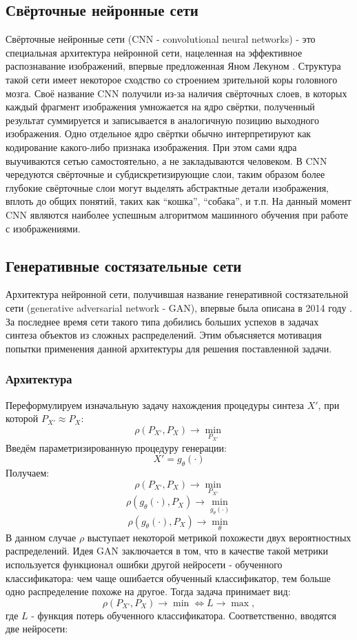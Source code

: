 	\subsection{Свёрточные нейронные сети}
		Свёрточные нейронные сети (CNN - convolutional neural networks) - это специальная архитектура нейронной сети, нацеленная на эффективное распознавание изображений, впервые предложенная Яном Лекуном \cite{LeCun}. Структура такой сети имеет некоторое сходство со строением зрительной коры головного мозга. Своё название CNN получили из-за наличия свёрточных слоев, в которых каждый фрагмент изображения умножается на ядро свёртки, полученный результат суммируется и записывается в аналогичную позицию выходного изображения. Одно отдельное ядро свёртки обычно интерпретируют как кодирование какого-либо признака изображения. При этом сами ядра выучиваются сетью самостоятельно, а не закладываются человеком. В CNN чередуются свёрточные и субдискретизирующие слои, таким образом более глубокие свёрточные слои могут выделять абстрактные детали изображения, вплоть до общих понятий, таких как ``кошка'', ``собака'', и т.п. На данный момент CNN являются наиболее успешным алгоритмом машинного обучения при работе с изображениями.
	\subsection{Генеративные состязательные сети}
		Архитектура нейронной сети, получившая название генеративной состязательной сети (generative adversarial network - GAN), впервые была описана в 2014 году \cite{Goodfellow}. За последнее время сети такого типа добились больших успехов в задачах синтеза объектов из сложных распределений. Этим объясняется мотивация попытки применения данной архитектуры для решения поставленной задачи.
		\subsubsection{Архитектура}
			Переформулируем изначальную задачу нахождения процедуры синтеза $X'$, при которой $ P_{X'} \approx P_X$:
			$$ \rho(P_{X'}, P_X) \longrightarrow \underset{P_{X'}}{\min} $$
			Введём параметризированную процедуру генерации:
			$$ X' = g_{\theta}(\cdot) $$
			Получаем:
			$$ \rho(P_{X'}, P_X) \longrightarrow \underset{P_{X'}}{\min} $$
			$$ \rho(g_{\theta}(\cdot), P_X) \longrightarrow \underset{g_{\theta}(\cdot)}{\min} $$
			$$ \rho(g_{\theta}(\cdot), P_X) \longrightarrow \underset{\theta}{\min} $$
			В данном случае $\rho$ выступает некоторой метрикой похожести двух вероятностных распределений.
			Идея GAN заключается в том, что в качестве такой метрики используется функционал ошибки другой нейросети -  обученного классификатора: чем чаще ошибается обученный классификатор, тем больше одно распределение похоже на другое. Тогда задача принимает вид:
			$$ \rho(P_{X'}, P_X) \longrightarrow \min \Leftrightarrow L \longrightarrow \max, $$
			где $L$ - функция потерь обученного классификатора.
			Соответственно, вводятся две нейросети:
	
